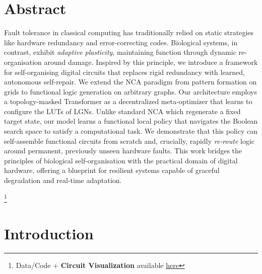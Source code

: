 \begin{abstract}
Alexander Mordvintsev conceived the initial project idea and developed the inital software: the implementation of differentiable Boolean circuits and the graphical interface for observing standard backpropagation behaviour. The author and Marcello Barylli formalized the architectural shift to use a Transformer as a meta-optimizer. The author led the development and optimization of the NCA framework, implementing graph-based models, the meta-learning infrastructure and the random pool mechanism, and conducted the bulk of the "growth" wiring experiments. Marcello conducted the primary experiments regarding functional maintenance, and the analysis on parameter space trajectories.

\end{abstract}

\section{Abstract}
Fault tolerance in classical computing has traditionally relied on static strategies like hardware redundancy and error-correcting codes. Biological systems, in contrast, exhibit \textit{adaptive plasticity}, maintaining function through dynamic re-organisation around damage. Inspired by this principle, we introduce a framework for self-organising digital circuits that replaces rigid redundancy with learned, autonomous self-repair. We extend the \acf{NCA} paradigm from pattern formation on grids to functional logic generation on arbitrary graphs. Our architecture employs a topology-masked Transformer as a decentralized meta-optimizer that learns to configure the \acfp{LUT} of \acfp{LGN}. Unlike standard NCA which regenerate a fixed target state, our model learns a functional local policy that navigates the Boolean search space to satisfy a computational task. We demonstrate that this policy can self-assemble functional circuits from scratch and, crucially, rapidly \textit{re-route} logic around permanent, previously unseen hardware faults. This work bridges the principles of biological self-organisation with the practical domain of digital hardware, offering a blueprint for resilient systems capable of graceful degradation and real-time adaptation.

\footnote{Data/Code + \textbf{Circuit Visualization} available \href{https://github.com/GabrielBena/boolean_nca_cc/tree/gabi}{here}}


\section{Introduction}


